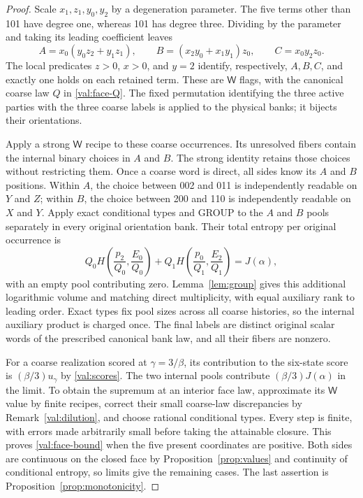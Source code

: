 \begin{proof}
Scale $x_1,z_1,y_0,y_2$ by a degeneration parameter.  The five terms other
than 101 have degree one, whereas 101 has degree three.  Dividing by the
parameter and taking its leading coefficient leaves
\[
 A=x_0(y_0z_2+y_1z_1),\qquad
 B=(x_2y_0+x_1y_1)z_0,\qquad C=x_0y_2z_0.
\]
The local predicates $z>0$, $x>0$, and $y=2$ identify, respectively,
$A,B,C$, and exactly one holds on each retained term.  These are $\mathsf W$ flags,
with the canonical coarse law $Q$ in \eqref{val:face-Q}.  The fixed
permutation identifying the three active parties with the three coarse
labels is applied to the physical banks; it bijects their orientations.

Apply a strong $\mathsf W$ recipe to these coarse occurrences.  Its unresolved
fibers contain the internal binary choices in $A$ and $B$.  The strong
identity retains those choices without restricting them.  Once a coarse
word is direct, all sides know its $A$ and $B$ positions.  Within $A$, the
choice between 002 and 011 is independently readable on $Y$ and $Z$;
within $B$, the choice between 200 and 110 is independently readable on
$X$ and $Y$.  Apply exact conditional types and GROUP to the $A$ and $B$
pools separately in every original orientation bank.
Their total entropy per original occurrence is
\[
 Q_0 H\left(\frac{p_2}{Q_0},\frac{E_0}{Q_0}\right)
 +Q_1 H\left(\frac{p_0}{Q_1},\frac{E_2}{Q_1}\right)
 =J(\alpha),
\]
with an empty pool contributing zero.  Lemma~\ref{lem:group} gives this
additional logarithmic volume and matching direct multiplicity, with equal
auxiliary rank to leading order.  Exact types fix pool sizes across all
coarse histories, so the internal auxiliary product is charged once.
The final labels are distinct original scalar words of the prescribed
canonical bank law, and all their fibers are nonzero.

For a coarse realization scored at $\gamma=3/\beta$, its contribution to
the six-state score is $(\beta/3)u_\gamma$ by
\eqref{val:scores}.  The two internal pools contribute
$(\beta/3)J(\alpha)$ in the limit.  To obtain the supremum at an interior
face law, approximate its $\mathsf W$ value by finite recipes, correct their small
coarse-law discrepancies by Remark~\ref{val:dilution}, and choose rational
conditional types.  Every step is finite, with errors made arbitrarily
small before taking the attainable closure.  This proves
\eqref{val:face-bound} when the five present coordinates are positive.
Both sides are continuous on the closed face by
Proposition~\ref{prop:values} and continuity of conditional entropy, so
limits give the remaining cases.  The last assertion is
Proposition~\ref{prop:monotonicity}.
\end{proof}
